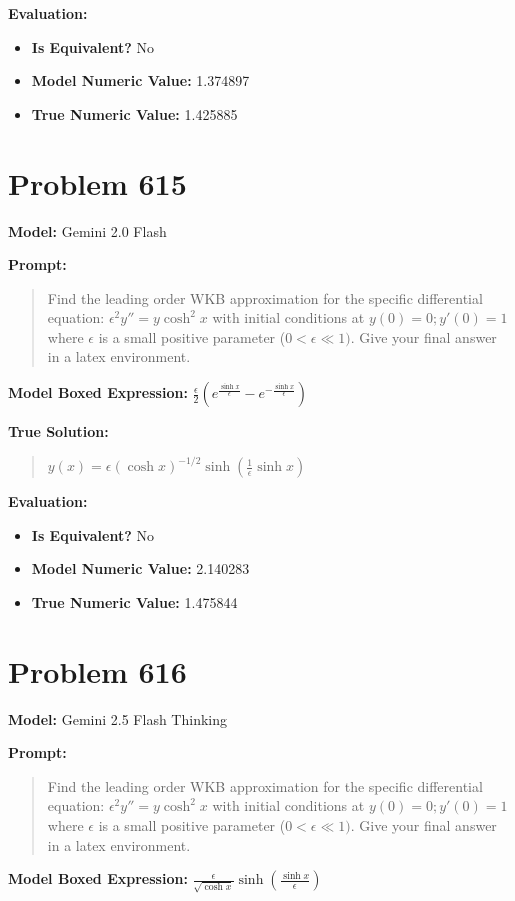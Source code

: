 \documentclass{article}
\begin{document}
\textbf{Evaluation:}
\begin{itemize}
\item \textbf{Is Equivalent?} No
\item \textbf{Model Numeric Value:} 1.374897
\item \textbf{True Numeric Value:} 1.425885
\end{itemize}
\vspace{1cm}
\section*{Problem 615}
\textbf{Model:} Gemini 2.0 Flash

\textbf{Prompt:}
\begin{quote}
Find the leading order WKB approximation for the specific differential equation: $\epsilon^2 y'' = y \cosh^2 x$ with initial conditions at $y(0) = 0; y'(0) = 1$ where $\epsilon$ is a small positive parameter ($0 < \epsilon \ll 1)$. Give your final answer in a \boxed latex environment.
\end{quote}
\textbf{Model Boxed Expression:} $\frac{\epsilon}{2}\left(e^{\frac{\sinh x}{\epsilon}}-e^{-\frac{\sinh x}{\epsilon}}\right)$

\textbf{True Solution:}
\begin{quote}
$y(x) = \epsilon (\cosh x)^{-1/2} \sinh\left( \frac{1}{\epsilon} \sinh x \right)$
\end{quote}

\textbf{Evaluation:}
\begin{itemize}
\item \textbf{Is Equivalent?} No
\item \textbf{Model Numeric Value:} 2.140283
\item \textbf{True Numeric Value:} 1.475844
\end{itemize}
\vspace{1cm}
\section*{Problem 616}
\textbf{Model:} Gemini 2.5 Flash Thinking

\textbf{Prompt:}
\begin{quote}
Find the leading order WKB approximation for the specific differential equation: $\epsilon^2 y'' = y \cosh^2 x$ with initial conditions at $y(0) = 0; y'(0) = 1$ where $\epsilon$ is a small positive parameter ($0 < \epsilon \ll 1)$. Give your final answer in a \boxed latex environment.
\end{quote}
\textbf{Model Boxed Expression:} $\frac{\epsilon}{\sqrt{\cosh x}} \sinh\left(\frac{\sinh x}{\epsilon}\right)$
\end{document}
